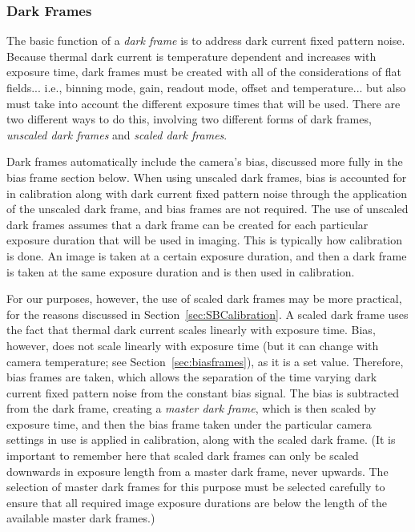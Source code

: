 \documentclass[10pt]{article}
\begin{document}
\subsubsection{Dark Frames}

The basic function of a \emph{dark frame} is to address dark current fixed pattern noise. Because thermal dark current is temperature dependent and increases with exposure time, dark frames must be created with all of the considerations of flat fields... i.e., binning mode, gain, readout mode, offset and temperature... but also must take into account the different exposure times that will be used. There are two different ways to do this, involving two different forms of dark frames, \emph{unscaled dark frames} and \emph{scaled dark frames}. 

Dark frames automatically include the camera's bias, discussed more fully in the bias frame section below. When using unscaled dark frames, bias is accounted for in calibration along with dark current fixed pattern noise through the application of the unscaled dark frame, and bias frames are not required. The use of unscaled dark frames assumes that a dark frame can be created for each particular exposure duration that will be used in imaging. This is typically how calibration is done. An image is taken at a certain exposure duration, and then a dark frame is taken at the same exposure duration and is then used in calibration.

For our purposes, however, the use of scaled dark frames may be more practical, for the reasons discussed in Section~\ref{sec:SBCalibration}. A scaled dark frame uses the fact that thermal dark current scales linearly with exposure time. Bias, however, does not scale linearly with exposure time (but it can change with camera temperature; see Section~\ref{sec:biasframes}), as it is a set value. Therefore, bias frames are taken, which allows the separation of the time varying dark current fixed pattern noise from the constant bias signal. The bias is subtracted from the dark frame, creating a \emph{master dark frame}, which is then scaled by exposure time, and then the bias frame taken under the particular camera settings in use is applied in calibration, along with the scaled dark frame. (It is important to remember here that scaled dark frames can only be scaled downwards in exposure length from a master dark frame, never upwards. The selection of master dark frames for this purpose must be selected carefully to ensure that all required image exposure durations are below the length of the available master dark frames.) 
\end{document}
